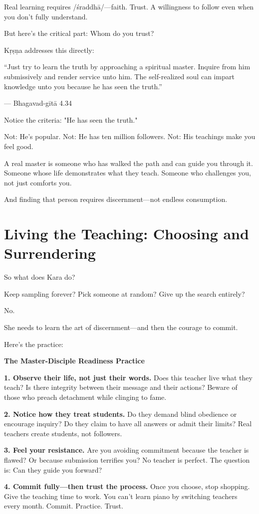 \documentclass[11pt,twoside]{book}
\begin{document}
Real learning requires /śraddhā/—faith. Trust. A willingness to follow even when you don't fully understand.

But here's the critical part: Whom do you trust?

Kṛṣṇa addresses this directly:

\begin{pullquote}
``Just try to learn the truth by approaching a spiritual master. Inquire from him submissively and render service unto him. The self-realized soul can impart knowledge unto you because he has seen the truth.''

--- Bhagavad-gītā 4.34
\end{pullquote}

Notice the criteria: "He has seen the truth."

Not: He's popular. Not: He has ten million followers. Not: His teachings make you feel good.

A real master is someone who has walked the path and can guide you through it. Someone whose life demonstrates what they teach. Someone who challenges you, not just comforts you.

And finding that person requires discernment—not endless consumption.

\section*{Living the Teaching: Choosing and Surrendering}

So what does Kara do?

Keep sampling forever? Pick someone at random? Give up the search entirely?

No.

She needs to learn the art of discernment—and then the courage to commit.

Here's the practice:

\begin{practicebox}
\textbf{The Master-Disciple Readiness Practice}

\textbf{1. Observe their life, not just their words.}
Does this teacher live what they teach? Is there integrity between their message and their actions? Beware of those who preach detachment while clinging to fame.

\textbf{2. Notice how they treat students.}
Do they demand blind obedience or encourage inquiry? Do they claim to have all answers or admit their limits? Real teachers create students, not followers.

\textbf{3. Feel your resistance.}
Are you avoiding commitment because the teacher is flawed? Or because submission terrifies you? No teacher is perfect. The question is: Can they guide you forward?

\textbf{4. Commit fully—then trust the process.}
Once you choose, stop shopping. Give the teaching time to work. You can't learn piano by switching teachers every month. Commit. Practice. Trust.
\end{practicebox}
\end{document}
